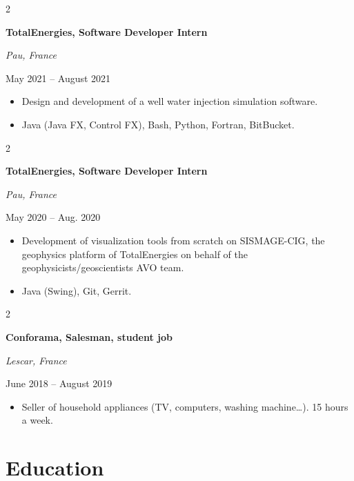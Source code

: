 \documentclass[10pt, letterpaper]{article}
\newenvironment{highlights}{
    \begin{itemize}[
        topsep=0.10 cm,
        parsep=0.10 cm,
        partopsep=0pt,
        itemsep=0pt,
        leftmargin=0.4 cm + 10pt
    ]
}{
    \end{itemize}
} %
\newenvironment{twocolentry}[2][]{
    \onecolentry
    \def\secondColumn{#2}
    \setcolumnwidth{\fill, 6 cm}
    \begin{paracol}{2}
}{
    \switchcolumn \raggedleft \secondColumn
    \end{paracol}
    \endonecolentry
} %
\begin{document}
        \vspace{0.2 cm}

        \begin{twocolentry}{\color{secondaryColor}May 2021 – August 2021}
            \textbf{TotalEnergies, Software Developer Intern}

            \textit{Pau, France}
        \end{twocolentry}
        
        \begin{highlights}
            \item Design and development of a well water injection simulation software.
            \item Java (Java FX, Control FX), Bash, Python, Fortran, BitBucket.
        \end{highlights}

        \vspace{0.2 cm}

        \begin{twocolentry}{\color{secondaryColor}May 2020 – Aug. 2020}
            \textbf{TotalEnergies, Software Developer Intern}

            \textit{Pau, France}
        \end{twocolentry}

        \begin{highlights}
            \item Development of visualization tools from scratch on SISMAGE-CIG, the geophysics platform of TotalEnergies on behalf of the geophysicists/geoscientists AVO team.
            \item Java (Swing), Git, Gerrit.
        \end{highlights}

        \vspace{0.2 cm}

        \begin{twocolentry}{\color{secondaryColor}June 2018 – August 2019}
            \textbf{Conforama, Salesman, student job}

            \textit{Lescar, France}
        \end{twocolentry}

        \begin{highlights}
            \item Seller of household appliances (TV, computers, washing machine…). 15 hours a week.
        \end{highlights}

    \section{Education}
    
\end{document}
